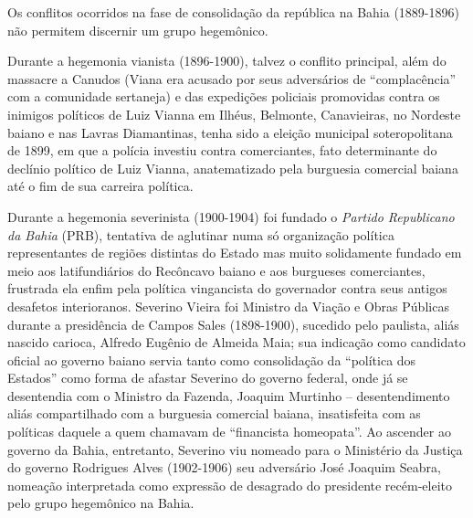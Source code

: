 Os conflitos ocorridos na fase de consolidação da república na Bahia (1889-1896) não permitem discernir um grupo hegemônico.

Durante a hegemonia vianista (1896-1900), talvez o conflito principal, além do massacre a Canudos (Viana era acusado por seus adversários de ``complacência'' com a comunidade sertaneja) e das expedições policiais promovidas contra os inimigos políticos de Luiz Vianna em Ilhéus, Belmonte, Canavieiras, no Nordeste baiano e nas Lavras Diamantinas, tenha sido a eleição municipal soteropolitana de 1899, em que a polícia investiu contra comerciantes, fato determinante do declínio político de Luiz Vianna, anatematizado pela burguesia comercial baiana até o fim de sua carreira política. 

Durante a hegemonia severinista (1900-1904) foi fundado o \textit{Partido Republicano da Bahia} (PRB), tentativa de aglutinar numa só organização política representantes de regiões distintas do Estado mas muito solidamente fundado em meio aos latifundiários do Recôncavo baiano e aos burgueses comerciantes, frustrada ela enfim pela política vingancista do governador contra seus antigos desafetos interioranos. Severino Vieira foi Ministro da Viação e Obras Públicas durante a presidência de Campos Sales (1898-1900), sucedido pelo paulista, aliás nascido carioca, Alfredo Eugênio de Almeida Maia; sua indicação como candidato oficial ao governo baiano servia tanto como consolidação da ``política dos Estados'' como forma de afastar Severino do governo federal, onde já se desentendia com o Ministro da Fazenda, Joaquim Murtinho -- desentendimento aliás compartilhado com a burguesia comercial baiana, insatisfeita com as políticas daquele a quem chamavam de ``financista homeopata''. Ao ascender ao governo da Bahia, entretanto, Severino viu nomeado para o Ministério da Justiça do governo Rodrigues Alves (1902-1906) seu adversário José Joaquim Seabra, nomeação interpretada como expressão de desagrado do presidente recém-eleito pelo grupo hegemônico na Bahia. 

